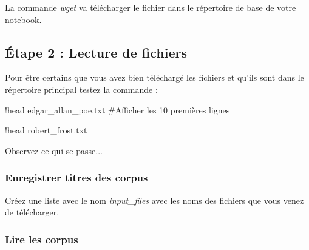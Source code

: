 La commande \textit{wget} va télécharger le fichier dans le répertoire de base de votre notebook. 

\subsection{Étape 2 : Lecture de fichiers}

Pour être certains que vous avez bien téléchargé les fichiers et qu'ils sont dans le répertoire principal testez la commande :

\begin{python} 
!head edgar_allan_poe.txt #Afficher les 10 premières lignes

!head robert_frost.txt
\end{python}

Observez ce qui se passe...


\subsubsection{Enregistrer titres des corpus}

Créez une liste avec le nom \textit{input\_files} avec les noms des fichiers que vous venez de télécharger.%


\subsubsection{Lire les corpus}

